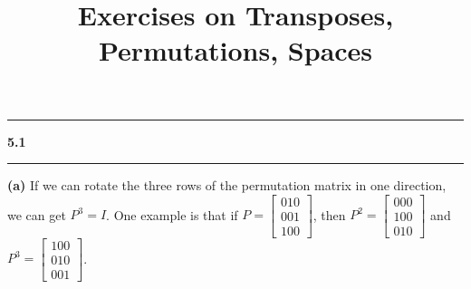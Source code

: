\documentclass[11pt]{article}
\newcommand\question[2]{\vspace{.25in}\hrule\textbf{#1 #2}\vspace{.5em}\hrule\vspace{.10in}}
\renewcommand\part[1]{\vspace{.10in}\textbf{(#1)}}
\begin{document}
\raggedright
\newcommand\NAME{Haiying Cui}  %
\newcommand\ANDREWID{Christy}     %
\newcommand\HWNUM{5}              %

\title{Exercises on Transposes, Permutations, Spaces}
\maketitle

\question{5.1}{}
\part{a} If we can rotate the three rows of the permutation matrix in one direction, we can get \(P^3 = I\). One example is that if \(P = \begin{bmatrix} 0 1 0 \\ 0 0 1 \\ 1 0 0 \end{bmatrix}\), then \(P^2 = \begin{bmatrix} 0 0 0 \\ 1 0 0 \\ 0 1 0 \end{bmatrix}\) and \(P^3 = \begin{bmatrix} 1 0 0 \\ 0 1 0 \\ 0 0 1 \end{bmatrix}\).
\end{document}

